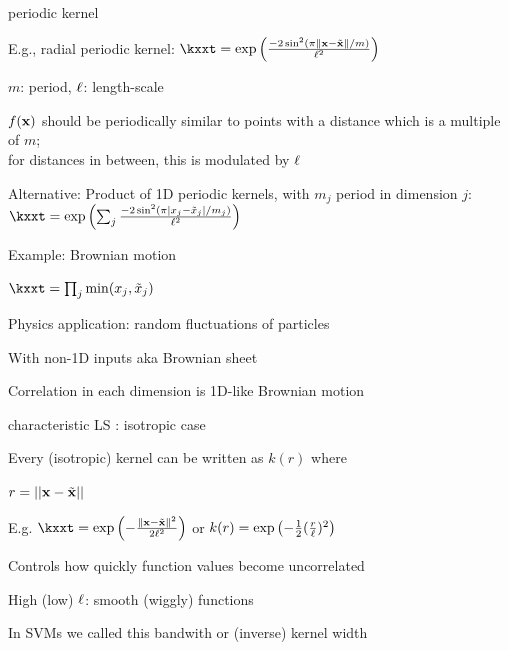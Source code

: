 \documentclass[11pt,compress,t,notes=noshow, xcolor=table]{beamer}
\begin{document}
\begin{framei}{periodic kernel}
\item E.g., radial periodic kernel: $\kxxt = \exp \left(\frac{-2\sin^2 (\pi \xxtnorm / m)}{\ls^2} \right)$
\item $m$: period, $\ell$: length-scale
\item $f(\mathbf{x})$ should be periodically similar to points with a distance which is a multiple of $m$;\\
for distances in between, this is modulated by $\ell$
\item Alternative: Product of 1D periodic kernels, with $m_j$ period in dimension $j$: $\kxxt =  \exp \left(\sum_j\frac{-2\sin^2 (\pi |x_j - \tilde{x}_j| / m_j)}{\ls^2} \right)$
\vfill
{}
\end{framei}

\begin{framei}[sep=S]{Example: Brownian motion}
\item $ \kxxt = \prod_j \min (x_j, \tilde{x}_j)$
\item Physics application: random fluctuations of particles
\item With non-1D inputs aka Brownian sheet
\item Correlation in each dimension is 1D-like Brownian motion
\vfill
{}
\end{framei}

\begin{framei}[sep=M]{characteristic LS : isotropic case}
\item Every (isotropic) kernel can be written as $k(r)$ where %
\item $r=||\mathbf{x}-\tilde{\mathbf{x}}||$
\item E.g. $\kxxt = \exp \left(-\frac{\xxtnorm^2}{2\ls^2} \right)$ or $k(r) = \exp \left(-\frac{1}{2}(\frac{r}{\ell})^2\right)$ 
\item Controls how quickly function values become uncorrelated
\item High (low) $\ell$: smooth (wiggly) functions
\vfill
{}
\item In SVMs we called this bandwith or (inverse) kernel width
\end{framei}
\end{document}
